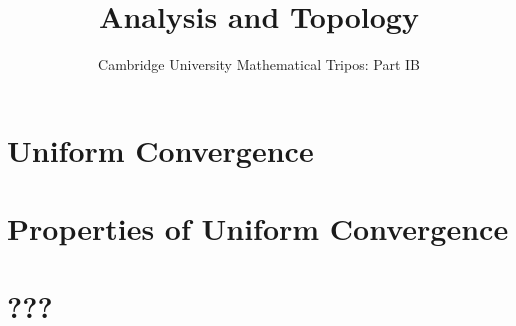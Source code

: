 \documentclass{article}
\title{Analysis and Topology}
\author{Cambridge University Mathematical Tripos: Part IB}
\begin{document}
\maketitle

\tableofcontentsnewpage{}

\section{Uniform Convergence}

\section{Properties of Uniform Convergence}

\section{???}

\end{document}
